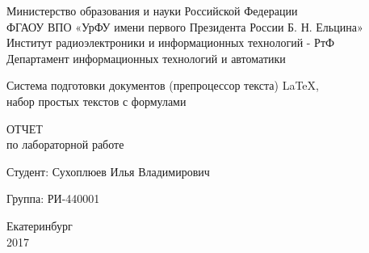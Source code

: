 \begin{titlepage}
  \begin{center}
    Министерство образования и науки Российской Федерации\\
    ФГАОУ ВПО  «УрФУ имени первого Президента России Б. Н. Ельцина»\\
    Институт радиоэлектроники и информационных технологий - РтФ\\
    Департамент информационных технологий и автоматики
    \par
    \vspace{5.5cm}
    \Large{
      Система подготовки документов (препроцессор текста) \LaTeX{}, \\
      набор простых текстов с формулами
      
      \par
      \vspace{1cm}

      ОТЧЕТ\\
      по лабораторной работе
    }

    \vspace{5cm}
    {
      Студент: \hfill Сухоплюев Илья Владимирович
    }
    \par
    {
      Группа: \hfill РИ-440001
    }

    \par
    \vspace{4cm}
    Екатеринбург\\
    2017
  \end{center}
\end{titlepage}